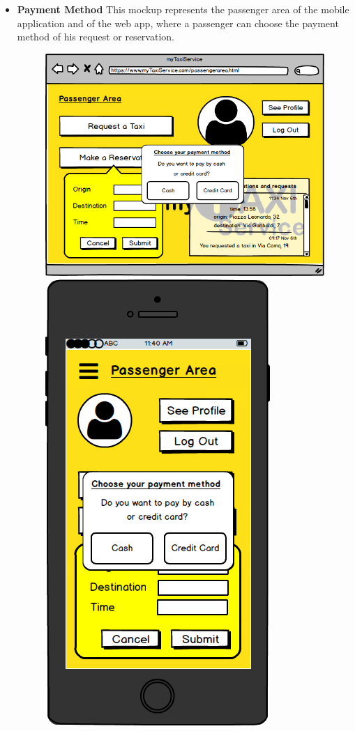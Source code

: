 \documentclass[18pt,oneside,a4paper, titlepage]{article}
\begin{document}
\begin{itemize}
\begin{figure}[h]
				\end{figure}
				\\ \\ \\
				\item \textbf{Payment Method} This mockup represents the passenger area of the mobile application and of the web app, where a passenger can choose the payment method of his request or reservation.\\
				\begin{figure}[h]
					\includegraphics[scale=0.3]{WebAppPaymentMethod.png}%
					\qquad\qquad
					\includegraphics[scale=0.3]{MobileAppPaymentMethod.png}

\end{figure}
\end{itemize}
\end{document}
